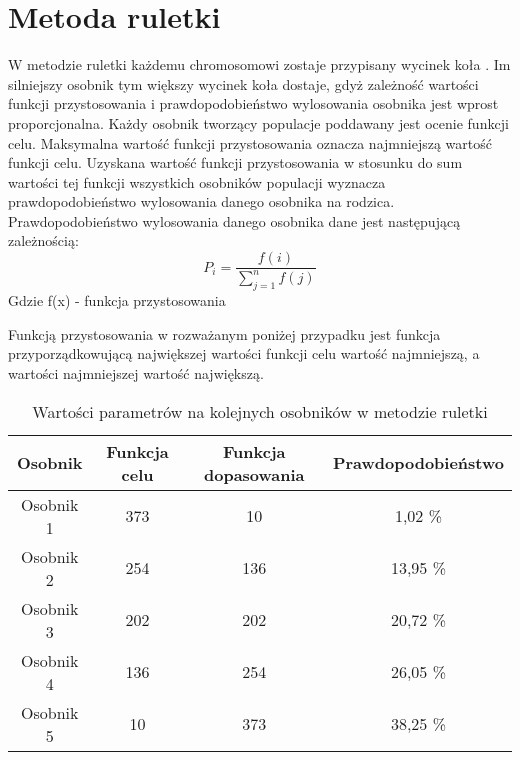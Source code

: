 
\section{Metoda ruletki}\label{sec:narzedzia}


W metodzie ruletki każdemu chromosomowi zostaje przypisany wycinek koła \cite{selekcje}. Im silniejszy osobnik tym większy wycinek koła dostaje, gdyż zależność wartości funkcji przystosowania i prawdopodobieństwo wylosowania osobnika jest wprost proporcjonalna. Każdy osobnik tworzący populacje poddawany jest ocenie funkcji celu. Maksymalna wartość funkcji przystosowania oznacza najmniejszą wartość funkcji celu. Uzyskana wartość funkcji przystosowania w stosunku do sum wartości tej funkcji wszystkich osobników populacji wyznacza prawdopodobieństwo wylosowania danego osobnika na rodzica. Prawdopodobieństwo wylosowania danego osobnika dane jest następującą zależnością:
$$
P_i = \frac{f(i)}{\sum_{j=1}^{n}f(j)}
$$
Gdzie f(x) - funkcja przystosowania\\
\par
Funkcją przystosowania w rozważanym poniżej przypadku jest funkcja przyporządkowującą największej wartości funkcji celu wartość najmniejszą, a wartości najmniejszej wartość największą.

\begin{table}[h!]
\begin{center}
\begin{tabular}{|c|c|c|c|}
\hline
\textbf{Osobnik}  & \textbf{Funkcja celu} & \textbf{Funkcja dopasowania} & \textbf{Prawdopodobieństwo}\\
\hline
Osobnik 1 & 373 & 10 & 1,02  \% \\
\hline
Osobnik 2 &254 & 136  & 13,95  \% \\
\hline
Osobnik 3 & 202 & 202 & 20,72  \% \\
\hline
Osobnik 4 & 136 & 254 & 26,05  \% \\
\hline
Osobnik 5 & 10 & 373 & 38,25  \% \\
\hline
\end{tabular}
\caption{Wartości parametrów na kolejnych osobników w metodzie ruletki}
\end{center}
\end{table}

\vspace{0,4cm}

